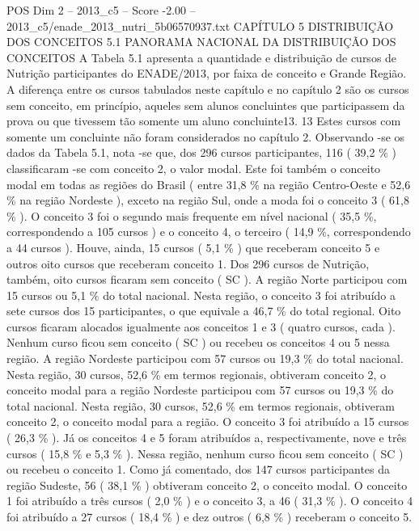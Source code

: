 \begin{textsample}{POS Dim 2 – 2013\_c5 – Score -2.00 – 2013\_c5/enade\_2013\_nutri\_5b06570937.txt}  \label{ex:f2_pos_368}
CAPÍTULO 5 DISTRIBUIÇÃO DOS CONCEITOS 5.1 PANORAMA NACIONAL DA DISTRIBUIÇÃO DOS CONCEITOS A Tabela 5.1 apresenta a quantidade e distribuição de cursos de Nutrição participantes do ENADE/2013, por faixa de conceito e Grande Região.
A diferença entre os cursos tabulados neste capítulo e no capítulo 2 são os cursos sem conceito, em princípio, aqueles sem alunos concluintes que participassem da prova ou que tivessem tão somente um aluno concluinte13. 13 Estes cursos com somente um concluinte não foram considerados no capítulo 2.
Observando -se os dados da Tabela 5.1, nota -se que, dos 296 cursos participantes, 116 ( 39,2 \% ) classificaram -se com conceito 2, o valor modal.
Este foi também o conceito modal em todas as regiões do Brasil ( entre 31,8 \% na região Centro-Oeste e 52,6 \% na região Nordeste ), exceto na região Sul, onde a moda foi o conceito 3 ( 61,8 \% ).
O conceito 3 foi o segundo mais frequente em nível nacional ( 35,5 \%, correspondendo a 105 cursos ) e o conceito 4, o terceiro ( 14,9 \%, correspondendo a 44 cursos ).
Houve, ainda, 15 cursos ( 5,1 \% ) que receberam conceito 5 e outros oito cursos que receberam conceito 1.
Dos 296 cursos de Nutrição, também, oito cursos ficaram sem conceito ( SC ).
A região Norte participou com 15 cursos ou 5,1 \% do total nacional.
Nesta região, o conceito 3 foi atribuído a sete cursos dos 15 participantes, o que equivale a 46,7 \% do total regional.
Oito cursos ficaram alocados igualmente aos conceitos 1 e 3 ( quatro cursos, cada ).
Nenhum curso ficou sem conceito ( SC ) ou recebeu os conceitos 4 ou 5 nessa região.
A região Nordeste participou com 57 cursos ou 19,3 \% do total nacional.
Nesta região, 30 cursos, 52,6 \% em termos regionais, obtiveram conceito 2, o conceito modal para a região Nordeste participou com 57 cursos ou 19,3 \% do total nacional.
Nesta região, 30 cursos, 52,6 \% em termos regionais, obtiveram conceito 2, o conceito modal para a região.
O conceito 3 foi atribuído a 15 cursos ( 26,3 \% ).
Já os conceitos 4 e 5 foram atribuídos a, respectivamente, nove e três cursos ( 15,8 \% e 5,3 \% ).
Nessa região, nenhum curso ficou sem conceito ( SC ) ou recebeu o conceito 1.
Como já comentado, dos 147 cursos participantes da região Sudeste, 56 ( 38,1 \% ) obtiveram conceito 2, o conceito modal.
O conceito 1 foi atribuído a três cursos ( 2,0 \% ) e o conceito 3, a 46 ( 31,3 \% ).
O conceito 4 foi atribuído a 27 cursos ( 18,4 \% ) e dez outros ( 6,8 \% ) receberam o conceito 5.

\end{textsample}
